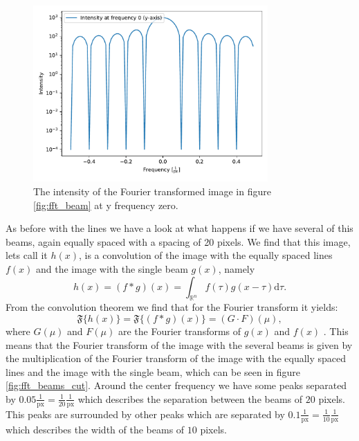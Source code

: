\begin{figure}[H]
	\centering
		\includegraphics[width=0.8\textwidth]{pics/fft_simulation_cutonebeam.pdf}
		\caption{The intensity of the Fourier transformed image in figure \ref{fig:fft_beam} at y frequency zero.}
		\label{fig:fft_beam_cut}
\end{figure}
As before with the lines we have a look at what happens if we have several of this beams, again equally spaced with a spacing of 20 pixels. We find that this image, lets call it $h(x)$, is a convolution of the image with the equally spaced lines $f(x)$ and the image with the single beam $g(x)$, namely
\begin{equation}
	h(x) = (f * g)(x) = \int_{\mathbb{R}^n} f(\tau)g(x-\tau) \mathrm{d}\tau .
\end{equation}
From the convolution theorem we find that for the Fourier transform it yields:
\begin{equation}
	\mathfrak{F}\{h(x)\} = \mathfrak{F}\{(f * g)(x)\} = (G \cdot F)(\mu),
\end{equation}
where $G(\mu)$ and $F(\mu)$ are the Fourier transforms of $g(x)$ and $f(x)$ \cite{ImageProcessing}. This means that the Fourier transform of the image with the several beams is given by the multiplication of the Fourier transform of the image with the equally spaced lines and the image with the single beam, which can be seen in figure \ref{fig:fft_beams_cut}. Around the center frequency we have some peaks separated by $0.05 \frac{1}{\mathrm{px}} = \frac{1}{20} \frac{1}{\mathrm{px}}$ which describes the separation between the beams of $20$ pixels. This peaks are surrounded by other peaks which are separated by $0.1 \frac{1}{\mathrm{px}} = \frac{1}{10} \frac{1}{\mathrm{px}}$ which describes the width of the beams of $10$ pixels.
